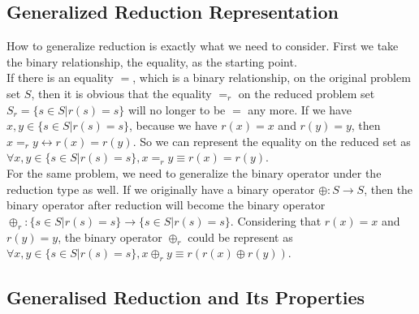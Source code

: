 \documentclass[a4paper,10pt]{article}
\begin{document}
\subsection{Generalized Reduction Representation}
How to generalize reduction is exactly what we need to consider.
First we take the binary relationship, the equality, as the starting point.\\
If there is an equality $=$, which is a binary relationship, on the original problem set $S$, then it is obvious that the equality $=_r$ on the reduced problem set  $S_r = \{s\in S|r(s)= s\}$ will no longer to be $=$ any more. If we have $x,y \in \{s\in S|r(s)= s\}$, because we have $r(x) =x$ and $r(y) = y$, then $x =_r y \leftrightarrow r(x) = r(y)$. So we can represent the equality on the reduced set as $\forall x,y \in \{s\in S|r(s)= s\}, x =_r y \equiv r(x) = r(y)$.\\
For the same problem, we need to generalize the binary operator under the reduction type as well.
If we originally have a binary operator $\oplus : S \rightarrow S$, then the binary operator after reduction will become the binary operator $\oplus_r : \{s\in S|r(s)= s\} \rightarrow \{s\in S|r(s)= s\}$. Considering that $r(x) =x$ and $r(y) = y$, the binary operator $\oplus_r$ could be represent as $\forall x,y \in \{s\in S|r(s)= s\}, x \oplus_r y \equiv r(r(x) \oplus r(y))$.\\
\subsection{Generalised Reduction and Its Properties}
\end{document}
